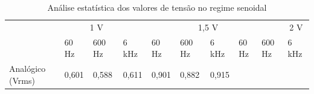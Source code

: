 \documentclass[14pt, oneside]{book}
\theoremstyle{definition}
\begin{document}
                \begin{table}[H]
                    \centering
                    {\renewcommand\arraystretch{1.25}
                    \caption{Análise estatística dos valores de tensão no regime senoidal}
                    \begin{tabular}{ l l l l l l l l l l }
                        \cline{1-1}\cline{2-2}\cline{3-3}\cline{4-4}\cline{5-5}\cline{6-6}\cline{7-7}\cline{8-8}\cline{9-9}\cline{10-10}  
                            \multicolumn{1}{|p{3.033cm}|}{{  \centering }} &
                            \multicolumn{3}{p{3.883cm}|}{\centering \ \ \ \ \ \ 1 V  } &
                            \multicolumn{3}{p{3.117cm}|}{\ \ \ \ \ \ \ \ \ \ \ 1,5  V \centering } &
                            \multicolumn{3}{p{2.733cm}|}{\ \ \ \ \ \ \ \ \ \ \ \ 2 V \centering }
                      \\  
                        \cline{2-2}\cline{3-3}\cline{4-4}\cline{5-5}\cline{6-6}\cline{7-7}\cline{8-8}\cline{9-9}\cline{10-10}  
                            \multicolumn{1}{|p{1.0cm}|}{} &
                            \multicolumn{1}{p{1.367cm}|}{60 Hz \centering } &
                            \multicolumn{1}{p{1.333cm}|}{600 Hz \centering } &
                            \multicolumn{1}{p{1.000cm}|}{6 kHz \centering } &
                            \multicolumn{1}{p{1.350cm}|}{60 Hz \centering } &
                            \multicolumn{1}{p{1.050cm}|}{600 Hz \centering } &
                            \multicolumn{1}{p{0.983cm}|}{6 kHz \centering } &
                            \multicolumn{1}{p{1.350cm}|}{60 Hz \centering } &
                            \multicolumn{1}{p{1.050cm}|}{600 Hz \centering } &
                            \multicolumn{1}{p{0.933cm}|}{6 kHz \centering }
                      \\  
                        \cline{1-1}\cline{2-2}\cline{3-3}\cline{4-4}\cline{5-5}\cline{6-6}\cline{7-7}\cline{8-8}\cline{9-9}\cline{10-10}  
                            \multicolumn{1}{|p{3.033cm}|}{Analógico (Vrms) \centering } &
                            \multicolumn{1}{p{1.367cm}|}{0,601 \centering } &
                            \multicolumn{1}{p{1.333cm}|}{0,588 \centering } &
                            \multicolumn{1}{p{1.000cm}|}{0,611 \centering } &
                            \multicolumn{1}{p{1.350cm}|}{0,901 \centering } &
                            \multicolumn{1}{p{1.050cm}|}{0,882 \centering } &
                            \multicolumn{1}{p{0.983cm}|}{0,915 \centering } &

\end{tabular}}
\end{table}
\end{document}
